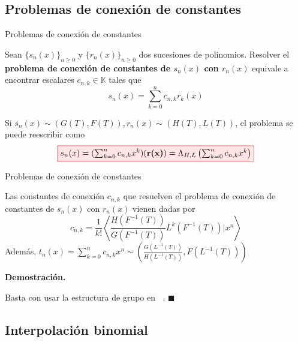 \documentclass{beamer}
\newenvironment{teorema}[1][]{
  \begin{tcolorbox}[colback=darkred!10, colframe=darkred!90, title=Teorema\ #1, fonttitle=\bfseries]
}{
  \end{tcolorbox}
}
\newenvironment{definicion}[1][]{
  \begin{tcolorbox}[colback=red!10, colframe=red!80!black, title=Definición\ #1, fonttitle=\bfseries]
}{
  \end{tcolorbox}
}
\newenvironment{demo}{%
  \par\medskip\noindent\textbf{Demostración.}\hspace{0.5em}%
}{%
  \hfill$\blacksquare$\par\medskip%
}
\newcommand{\rboxed}[1]{%
  \fcolorbox{red!80!black}{red!10}{$#1$}%
}
\newcommand{\field}{\mathbb{K}} %
\DeclareMathOperator*{\Sh}{Sh(\mathbb{P})} %
\begin{document}
\subsection{Problemas de conexión de constantes}
\begin{frame}{Problemas de conexión de constantes}
  \begin{definicion}
    Sean $\{s_n(x)\}_{n \geq 0}$ y $\{r_n(x)\}_{n \geq 0}$ dos sucesiones de polinomios. Resolver el \textbf{problema de conexión de constantes de $s_n(x)$ con $r_n(x)$} equivale a encontrar escalares $c_{n,k} \in \field$ tales que
    \begin{equation*}
        s_n(x) = \sum_{k=0}^n c_{n,k}r_k(x)
    \end{equation*} 
  \end{definicion}

  Si $s_n(x) \sim (G(T), F(T)), r_n(x) \sim (H(T), L(T))$, el problema se puede reescribir como
    \begin{equation*}
      \rboxed{s_n(x) = (\sum_{k=0}^n c_{n,k} x^k)(\mbox{\bfseries r(x)}) = \Lambda_{H,L}\left( \sum_{k=0}^n c_{n,k} x^k \right)}
    \end{equation*}
\end{frame}

\begin{frame}{Problemas de conexión de constantes}
  \begin{teorema}[(de solución para sucesiones de Sheffer)]
    Las constantes de conexión $c_{n,k}$ que resuelven el problema de conexión de constantes de $s_n(x)$ con $r_n(x)$ vienen dadas por
    \begin{equation*}
        c_{n,k} = \frac{1}{k!} \left\langle \frac{H(F^{-1}(T))}{G(F^{-1}(T))} L^k(F^{-1}(T))| x^n \right\rangle
    \end{equation*}
    Además,  $\displaystyle t_n(x) = \sum_{k=0}^n c_{n,k}x^n \sim \left(\frac{G(L^{-1}(T))}{H(L^{-1}(T))}, F(L^{-1}(T))\right)$
\end{teorema}

\begin{demo}
  Basta con usar la estructura de grupo en $\Sh$.
\end{demo}
\end{frame}

\subsection{Interpolación binomial}
\end{document}

